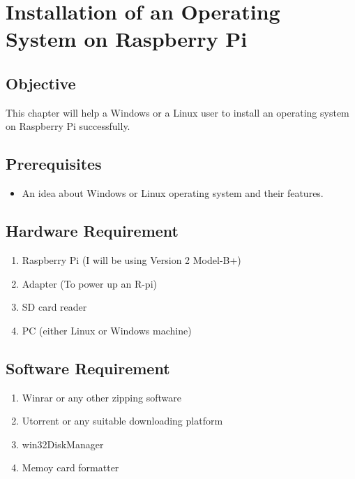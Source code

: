 \documentclass[11pt,a4paper]{report}
\author{e-Yantra summer internship 2017}
\date{July 5,2017}
\begin{document}
	\maketitle
	\newpage
	\tableofcontents{}
	\newpage
	
	\chapter{Installation of an Operating System on Raspberry Pi}
	\section{Objective}
	\begin{flushleft}
	 This chapter will help a Windows or a Linux user to install an operating system on Raspberry Pi successfully.
	\end{flushleft}
	\section{Prerequisites}
	\begin{itemize}
		\item An idea about Windows or Linux operating system and their features.
	\end{itemize}
	\section{Hardware Requirement}
	\begin{enumerate}
		\item Raspberry Pi (I will be using Version 2 Model-B+)
		\item Adapter (To power up an R-pi)
		\item SD card reader
		\item PC (either Linux or Windows machine)
	\end{enumerate}
	\section{Software Requirement}
	\begin{enumerate}
		\item Winrar or any other zipping software 
		\item Utorrent or any suitable downloading platform	
		\item win32DiskManager
		\item Memoy card formatter 
	\end{enumerate}
	\newpage
\end{document}
